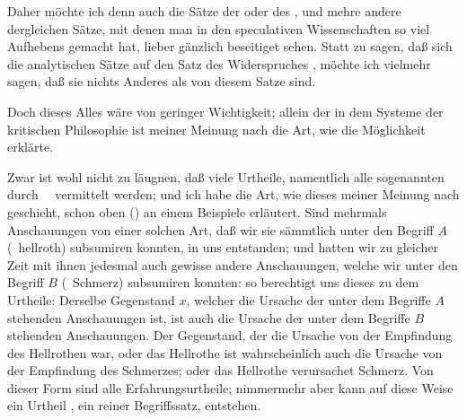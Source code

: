 \begin{aufza}
\item  Daher möchte ich denn auch die Sätze der  oder des , und mehre andere dergleichen Sätze, mit denen man in den speculativen Wissenschaften so viel Aufhebens gemacht hat, lieber gänzlich beseitiget sehen. Statt zu sagen, daß sich die analytischen Sätze auf den Satz des Widerspruches , möchte ich vielmehr sagen, daß sie nichts Anderes als  von diesem Satze sind.
\item Doch dieses Alles wäre von geringer Wichtigkeit; allein der  in dem Systeme der kritischen Philosophie ist meiner Meinung nach die Art, wie  die Möglichkeit  erklärte.
\begin{aufzb}
\item Zwar ist wohl nicht zu läugnen, daß viele Urtheile, namentlich alle sogenannten  durch~\  vermittelt werden; und ich habe die Art, wie dieses meiner Meinung nach geschieht, schon oben () an einem Beispiele erläutert. Sind mehrmals Anschauungen von einer solchen Art, daß wir sie sämmtlich unter den Begriff $A$ (\zB\ hellroth) subsumiren konnten, in uns entstanden; und hatten wir zu gleicher Zeit mit ihnen jedesmal auch gewisse andere Anschauungen, welche wir unter den Begriff $B$ (\zB\ Schmerz) subsumiren konnten: so berechtigt uns dieses zu dem Urtheile: Derselbe Gegenstand $x$, welcher die Ursache der unter dem Begriffe $A$ stehenden Anschauungen ist, ist  auch die Ursache der unter dem Begriffe $B$ stehenden Anschauungen. Der Gegenstand, der die Ursache von der Empfindung des Hellrothen war, oder das Hellrothe ist wahrscheinlich auch die Ursache von der Empfindung des Schmerzes; oder das Hellrothe verursachet Schmerz. Von dieser Form sind alle Erfahrungsurtheile; nimmermehr aber kann auf diese Weise ein Urtheil , ein reiner Begriffssatz, entstehen.

\end{aufzb}
\end{aufza}
